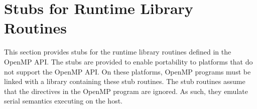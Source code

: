 %
%
%
%
%
%
%
%
%
%
%
%
%


\chapter{Stubs for Runtime Library Routines}
\label{chap:Stubs for Runtime Library Routines}
\label{chap:Appendix A}
This section provides stubs for the runtime library routines defined in the OpenMP API.
The stubs are provided to enable portability to platforms that do not support the
OpenMP API. On these platforms, OpenMP programs must be linked with a library
containing these stub routines. The stub routines assume that the directives in the
OpenMP program are ignored. As such, they emulate serial semantics
executing on the host.

